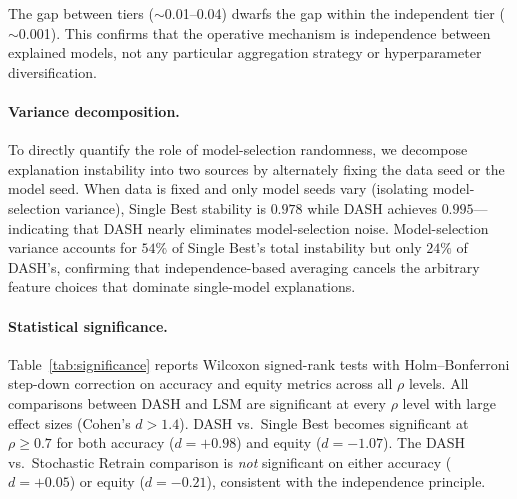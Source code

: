 \documentclass[11pt]{article}
\newcommand{\dash}{\textsc{DASH}}
\newcommand{\rhovar}{\rho}
\begin{document}
The gap between tiers ($\sim$0.01--0.04) dwarfs the gap within the
independent tier ($\sim$0.001). This confirms that the operative
mechanism is independence between explained models, not any particular
aggregation strategy or hyperparameter diversification.

\paragraph{Variance decomposition.}
To directly quantify the role of model-selection randomness, we
decompose explanation instability into two sources by alternately fixing
the data seed or the model seed. When data is fixed and only model seeds
vary (isolating model-selection variance), Single Best stability is
$0.978$ while \dash{} achieves $0.995$---indicating that \dash{}
nearly eliminates model-selection noise. Model-selection variance
accounts for $54\%$ of Single Best's total instability but only $24\%$
of \dash{}'s, confirming that independence-based averaging cancels the
arbitrary feature choices that dominate single-model explanations.

\paragraph{Statistical significance.}
Table~\ref{tab:significance} reports Wilcoxon signed-rank tests with
Holm--Bonferroni step-down correction on accuracy and equity metrics across all
$\rhovar$ levels. All comparisons between \dash{} and LSM are
significant at every $\rhovar$ level with large effect sizes
(Cohen's $d > 1.4$). \dash{} vs.\ Single Best becomes significant at
$\rhovar \geq 0.7$ for both accuracy ($d = +0.98$) and equity
($d = -1.07$). The \dash{} vs.\ Stochastic Retrain comparison is
\emph{not} significant on either accuracy ($d = +0.05$) or equity
($d = -0.21$), consistent with the independence principle.
\end{document}
